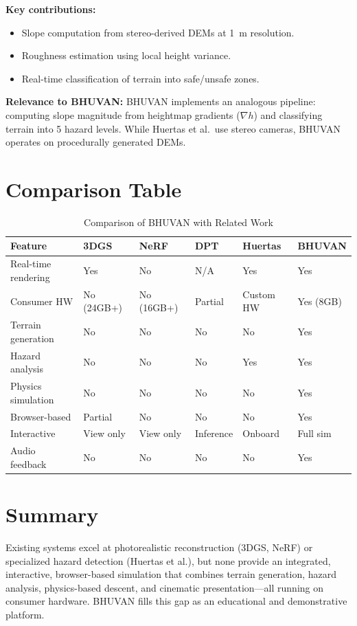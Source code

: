 \textbf{Key contributions:}
\begin{itemize}
    \item Slope computation from stereo-derived DEMs at 1~m resolution.
    \item Roughness estimation using local height variance.
    \item Real-time classification of terrain into safe/unsafe zones.
\end{itemize}

\textbf{Relevance to BHUVAN:}
BHUVAN implements an analogous pipeline: computing slope magnitude from heightmap gradients ($\nabla h$) and classifying terrain into 5 hazard levels. While Huertas et al.\ use stereo cameras, BHUVAN operates on procedurally generated DEMs.

\section{Comparison Table}

\begin{table}[h]
\centering
\caption{Comparison of BHUVAN with Related Work}
\label{tab:comparison}
\small
\begin{tabular}{|p{2.8cm}|p{2cm}|p{2cm}|p{2cm}|p{2cm}|p{2cm}|}
\hline
\textbf{Feature} & \textbf{3DGS \cite{kerbl2023gaussian}} & \textbf{NeRF \cite{mildenhall2020nerf}} & \textbf{DPT \cite{ranftl2021dpt}} & \textbf{Huertas \cite{huertas2006hazard}} & \textbf{BHUVAN} \\
\hline
Real-time rendering & Yes & No & N/A & Yes & Yes \\
\hline
Consumer HW & No (24GB+) & No (16GB+) & Partial & Custom HW & Yes (8GB) \\
\hline
Terrain generation & No & No & No & No & Yes \\
\hline
Hazard analysis & No & No & No & Yes & Yes \\
\hline
Physics simulation & No & No & No & No & Yes \\
\hline
Browser-based & Partial & No & No & No & Yes \\
\hline
Interactive & View only & View only & Inference & Onboard & Full sim \\
\hline
Audio feedback & No & No & No & No & Yes \\
\hline
\end{tabular}
\end{table}

\section{Summary}
Existing systems excel at photorealistic reconstruction (3DGS, NeRF) or specialized hazard detection (Huertas et al.), but none provide an integrated, interactive, browser-based simulation that combines terrain generation, hazard analysis, physics-based descent, and cinematic presentation---all running on consumer hardware. BHUVAN fills this gap as an educational and demonstrative platform.
